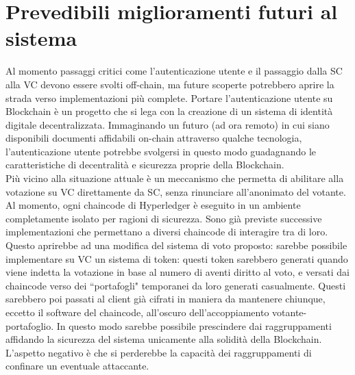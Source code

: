 \section{Prevedibili miglioramenti futuri al sistema}
	Al momento passaggi critici come l'autenticazione utente e il passaggio dalla SC alla VC devono essere svolti off-chain, ma future scoperte potrebbero aprire la strada verso implementazioni più complete.
	Portare l'autenticazione utente su Blockchain è un progetto che si lega con la creazione di un sistema di identità digitale decentralizzata. Immaginando un futuro (ad ora remoto) in cui siano disponibili documenti affidabili on-chain attraverso qualche tecnologia, l'autenticazione utente potrebbe svolgersi in questo modo guadagnando le caratteristiche di decentralità e sicurezza proprie della Blockchain. \\
	Più vicino alla situazione attuale è un meccanismo che permetta di abilitare alla votazione su VC direttamente da SC, senza rinunciare all'anonimato del votante. Al momento, ogni chaincode di Hyperledger è eseguito in un ambiente completamente isolato per ragioni di sicurezza. Sono già previste successive implementazioni che permettano a diversi chaincode di interagire tra di loro. Questo aprirebbe ad una modifica del sistema di voto proposto: sarebbe possibile implementare su VC un sistema di token: questi token sarebbero generati quando viene indetta la votazione in base al numero di aventi diritto al voto, e versati dai chaincode verso dei ``portafogli" temporanei da loro generati casualmente. Questi sarebbero poi passati al client già cifrati in maniera da mantenere chiunque, eccetto il software del chaincode, all'oscuro dell'accoppiamento votante-portafoglio. In questo modo sarebbe possibile prescindere dai raggruppamenti affidando la sicurezza del sistema unicamente alla solidità della Blockchain. L'aspetto negativo è che si perderebbe la capacità dei raggruppamenti di confinare un eventuale attaccante.